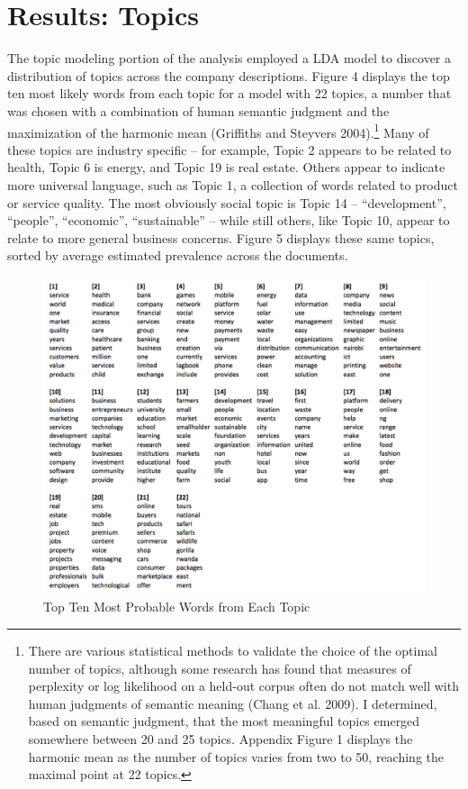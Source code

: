 \documentclass[12pt]{article}
\begin{document}
\FloatBarrier

\section{Results: Topics}

The topic modeling portion of the analysis employed a LDA model to discover a distribution of topics across the company descriptions. Figure 4 displays the top ten most likely words from each topic for a model with 22 topics, a number that was chosen with a combination of human semantic judgment and the maximization of the harmonic mean (Griffiths and Steyvers 2004).\footnote{There are various statistical methods to validate the choice of the optimal number of topics, although some research has found that measures of perplexity or log likelihood on a held-out corpus often do not match well with human judgments of semantic meaning (Chang et al. 2009). I determined, based on semantic judgment, that the most meaningful topics emerged somewhere between 20 and 25 topics. Appendix Figure 1 displays the harmonic mean as the number of topics varies from two to 50, reaching the maximal point at 22 topics.} Many of these topics are industry specific -- for example, Topic 2 appears to be related to health, Topic 6 is energy, and Topic 19 is real estate. Others appear to indicate more universal language, such as Topic 1, a collection of words related to product or service quality. The most obviously social topic is Topic 14 -- ``development'', ``people'', ``economic'', ``sustainable'' -- while still others, like Topic 10, appear to relate to more general business concerns. Figure 5 displays these same topics, sorted by average estimated prevalence across the documents.


\begin{figure} [!htb]
\centering
\includegraphics[scale=0.8]{Topics}
\caption{Top Ten Most Probable Words from Each Topic}
\end{figure}
\end{document}

